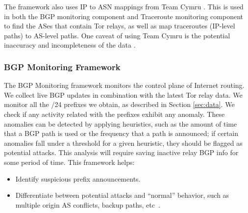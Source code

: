 The framework also uses IP to ASN mappings from Team Cymru \cite{teamcymru}.  This is used in both the BGP monitoring component and Traceroute monitoring component to find the ASes that contain Tor relays, as well as map traceroutes (IP-level paths) to AS-level paths.  One caveat of using Team Cymru is the potential inaccuracy and incompleteness of the data .


\subsubsection{BGP Monitoring Framework} 
\label{sec:bgp}
The BGP Monitoring framework monitors the control plane of Internet routing. We collect live BGP updates in combination with the latest Tor relay data. We monitor all the /24 prefixes we obtain, as described in Section \ref{sec:data}. We check if any activity related with the prefixes exhibit any anomaly. These anomalies can be detected by applying heuristics, such as the amount of time that a BGP path is used or the frequency that a path is announced; if certain anomalies fall under a threshold for a given heuristic, they should be flagged as potential attacks. This analysis will require saving inactive relay BGP info for some period of time.  This framework helps:

\begin{itemize}
\item Identify suspicious prefix announcements.
\item Differentiate between potential attacks and ``normal'' behavior, such as multiple origin AS conflicts, backup paths, etc~\cite{zhao2001analysis}.
\end{itemize}

